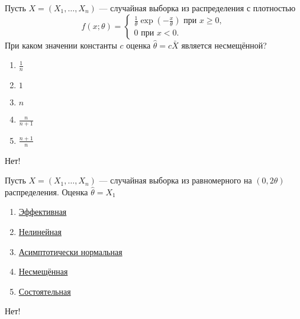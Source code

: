 \documentclass[t]{beamer}
\begin{document}
 \begin{frame} \label{45-No} 
\begin{block}{45} 

Пусть $X = (X_1, \ldots , X_n)$ — случайная выборка из распределения с плотностью
\[
f(x; \theta) =
\begin{cases}
\frac{1}{\theta}\exp(-\frac{x}{\theta}) \text{ при } x \geq 0,  \\
0 \text{ при } x < 0.
\end{cases}
\]
При каком значении константы $c$ оценка  $\hat{\theta} = c \bar{X}$ является несмещённой?
  


 \end{block} 
\begin{enumerate} 
\item[] \hyperlink{45-No}{\beamergotobutton{} $\frac{1}{n}$}
\item[] \hyperlink{45-Yes}{\beamergotobutton{} $1$}
\item[] \hyperlink{45-No}{\beamergotobutton{} $n$}
\item[] \hyperlink{45-No}{\beamergotobutton{} $\frac{n}{n + 1}$}
\item[] \hyperlink{45-No}{\beamergotobutton{} $\frac{n + 1}{n}$}
\end{enumerate} 

 \alert{Нет!} 
\end{frame} 


 \begin{frame} \label{46-No} 
\begin{block}{46} 

Пусть $X = (X_1, \ldots , X_n)$ — случайная выборка из равномерного на $(0, 2\theta)$ распределения. Оценка $\hat{\theta} = X_1$
  


 \end{block} 
\begin{enumerate} 
\item[] \hyperlink{46-No}{\beamergotobutton{} Эффективная}
\item[] \hyperlink{46-No}{\beamergotobutton{} Нелинейная}
\item[] \hyperlink{46-No}{\beamergotobutton{} Асимптотически нормальная}
\item[] \hyperlink{46-Yes}{\beamergotobutton{} Несмещённая}
\item[] \hyperlink{46-No}{\beamergotobutton{} Состоятельная}
\end{enumerate} 

 \alert{Нет!} 
\end{frame} 
\end{document}
